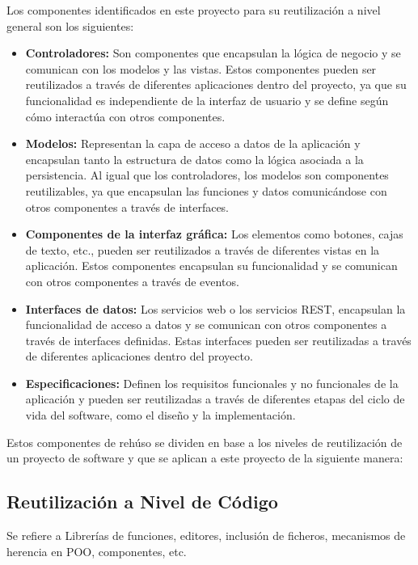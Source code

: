 \documentclass[runningheads]{llncs}
\begin{document}
            Los componentes identificados en este proyecto para su reutilización a nivel general son los siguientes:
            \begin{itemize}
                \item \textbf{Controladores: }Son componentes que encapsulan la lógica de negocio y se comunican con los modelos y las vistas. Estos componentes pueden ser reutilizados a través de diferentes aplicaciones dentro del proyecto, ya que su funcionalidad es independiente de la interfaz de usuario y se define según cómo interactúa con otros componentes.
                \item \textbf{Modelos: }Representan la capa de acceso a datos de la aplicación y encapsulan tanto la estructura de datos como la lógica asociada a la persistencia. Al igual que los controladores, los modelos son componentes reutilizables, ya que encapsulan las funciones y datos comunicándose con otros componentes a través de interfaces.
                \item \textbf{Componentes de la interfaz gráfica: }Los elementos como botones, cajas de texto, etc., pueden ser reutilizados a través de diferentes vistas en la aplicación. Estos componentes encapsulan su funcionalidad y se comunican con otros componentes a través de eventos.
                \item \textbf{Interfaces de datos: }Los servicios web o los servicios REST, encapsulan la funcionalidad de acceso a datos y se comunican con otros componentes a través de interfaces definidas. Estas interfaces pueden ser reutilizadas a través de diferentes aplicaciones dentro del proyecto.
                \item \textbf{Especificaciones: }Definen los requisitos funcionales y no funcionales de la aplicación y pueden ser reutilizadas a través de diferentes etapas del ciclo de vida del software, como el diseño y la implementación.
            \end{itemize}  

            Estos componentes de rehúso se dividen en base a los niveles de reutilización de un proyecto de software y que se aplican a este proyecto de la siguiente manera:

            \subsection*{Reutilización a Nivel de Código}
                Se refiere a Librerías de funciones, editores, inclusión de ficheros, mecanismos de herencia en POO, componentes, etc.
\end{document}
